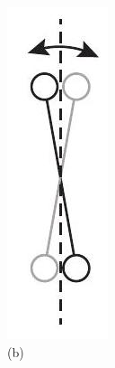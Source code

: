 \documentclass[10pt]{article}
\begin{document}
\includegraphics[max width=\textwidth, center]{2024_09_14_9969b06773f10b6936e8g-292(2)}\\
(b)
\end{document}
